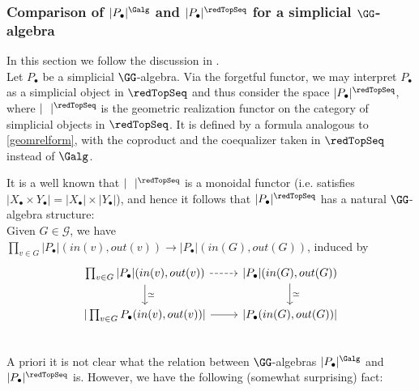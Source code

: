 \documentclass[a4paper,10pt]{amsart}
\begin{document}
\subsubsection{Comparison of $|P_\bullet|^{\Galg}$ and $|P_\bullet|^{\redTopSeq}$ for a simplicial $\GG$-algebra}
In this section we follow the discussion in \cite[Section 7]{mandell2019operads}.\\
Let $P_\bullet$ be a simplicial $\GG$-algebra. Via the forgetful functor, we may interpret $P_\bullet$ as a simplicial object in $\redTopSeq$ and thus consider the space $|P_\bullet|^{\redTopSeq}$, where $|\ \ |^{\redTopSeq}$ is the geometric realization functor on the category of simplicial objects in $\redTopSeq$. It is defined by a formula analogous to \ref{geomrelform}, with the coproduct and the coequalizer taken in $\redTopSeq$ instead of $\Galg$.


It is a well known that $|\ \ |^{\redTopSeq}$ is a monoidal functor (i.e. satisfies $|X_\bullet \times Y_\bullet| = |X_\bullet | \times |Y_\bullet |$), and hence it follows that $|P_\bullet|^{\redTopSeq}$ has a natural $\GG$-algebra structure:\\
Given $G \in \mathcal{G}$, we have $\prod_{v\in G} |P_\bullet|(in(v), out(v)) \to |P_\bullet|(in(G), out(G))$, induced by 
\[ 
	\begin{tikzcd}
	\prod_{v\in G} |P_\bullet|(in(v), out(v)) \ar[dashrightarrow]{r} \ar{d}{\simeq} &  {|P_\bullet|}(in(G), out(G)) \ar{d}{\simeq}  \\
	{|\prod_{v\in G} P_\bullet(in(v), out(v))|} \ar{r} & {|P_\bullet (in(G),out(G))| }\\
	\end{tikzcd}
\]
A priori it is not clear what the relation between $\GG$-algebras $|P_\bullet|^{\Galg}$ and $|P_\bullet|^{\redTopSeq}$ is. However, we have the following (somewhat surprising) fact:
\end{document}
